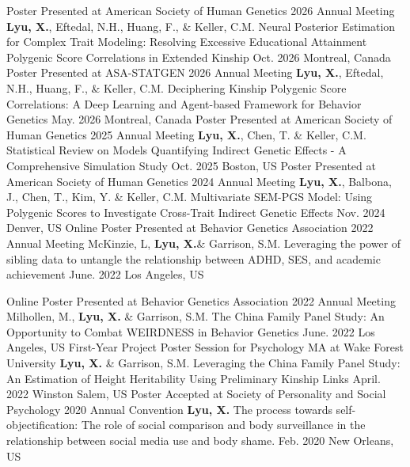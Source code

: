 

\begin{cventries2}

  \cventryx
    {Poster Presented at American Society of Human Genetics 2026 Annual Meeting} %
    {\textbf{Lyu, X.},  Eftedal, N.H., Huang, F., \& Keller, C.M.  Neural Posterior Estimation for Complex Trait Modeling: Resolving Excessive Educational Attainment Polygenic Score Correlations in Extended Kinship} 
    {Oct. 2026} %
    {Montreal, Canada} %
  \cventryx
    {Poster Presented at ASA-STATGEN 2026 Annual Meeting} %
    {\textbf{Lyu, X.},  Eftedal, N.H., Huang, F., \& Keller, C.M.  Deciphering Kinship Polygenic Score Correlations: A Deep Learning and Agent-based Framework for Behavior Genetics} 
    {May. 2026} %
    {Montreal, Canada} %
  \cventryx
    {Poster Presented at American Society of Human Genetics 2025 Annual Meeting} %
    {\textbf{Lyu, X.},  Chen, T. \& Keller, C.M.  Statistical Review on Models Quantifying Indirect Genetic Effects - A Comprehensive Simulation Study} 
    {Oct. 2025} %
    {Boston, US} %
  \cventryx
    {Poster Presented at American Society of Human Genetics 2024 Annual Meeting} %
    {\textbf{Lyu, X.}, Balbona, J., Chen, T., Kim, Y. \& Keller, C.M.  Multivariate SEM-PGS Model: Using Polygenic Scores to Investigate Cross-Trait Indirect Genetic Effects} 
    {Nov. 2024} %
    {Denver, US} %
  \cventryx
    {Online Poster Presented at Behavior Genetics Association 2022 Annual Meeting} %
    {McKinzie, L, \textbf{Lyu, X.}\& Garrison, S.M. Leveraging the power of sibling data to untangle the relationship between ADHD, SES, and academic achievement} 
    {June. 2022} %
    {Los Angeles, US} %
    
    \cventryx
  	{Online Poster Presented at Behavior Genetics Association 2022 Annual Meeting} %
    {Milhollen, M., \textbf{Lyu, X.}  \& Garrison, S.M. The China Family Panel Study: An Opportunity to Combat WEIRDNESS in Behavior Genetics} 
    {June. 2022} %
    {Los Angeles, US} %
    \cventryx
  	{First-Year Project Poster Session for Psychology MA at Wake Forest University} %
    {\textbf{Lyu, X.}  \& Garrison, S.M. Leveraging the China Family Panel Study: An Estimation of Height Heritability Using Preliminary Kinship Links} 
    {April. 2022} %
    {Winston Salem, US} %
    \cventryx
	{Poster Accepted at Society of Personality and Social Psychology 2020 Annual Convention} %
    {\textbf{Lyu, X.} The process towards self-objectification: The role of social comparison and body surveillance in the relationship between social media use and body shame. } %
    {Feb. 2020} %
    {New Orleans, US}

\end{cventries2}

